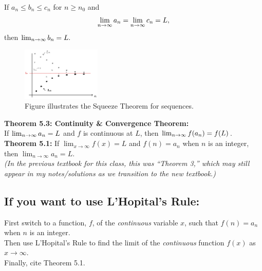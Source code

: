 If \(a_n \leq b_n \leq c_n\) for \(n \geq n_0\) and 
\[
\lim_{n\rightarrow\infty} a_n = \lim_{n\rightarrow\infty} c_n = L,
\]
then \(\lim_{n\rightarrow\infty} b_n = L.\)
~\\

\hspace*{.2in}


\begin{figure}[!h]
\centering
\includegraphics[height=1in]{Ch8s1-squeeze.png}
 \caption{Figure illustrates the Squeeze Theorem for sequences.}

\end{figure}



\textbf{Theorem 5.3: Continuity \& Convergence Theorem:}\\
If \( \lim_{n\rightarrow\infty} a_n = L\) and \(f\) is continuous at \(L\), then \( \lim_{n\rightarrow\infty} f(a_n) = f(L)\).\\




\textbf{Theorem 5.1:} If \(\lim_{x\rightarrow\infty} f(x) = L\) and \(f(n)=a_n\) when \(n\) is an integer, then \(\lim_{n\rightarrow\infty} a_n = L\).\\
\textit{(In the previous textbook for this class, this was ``Theorem 3,'' which may still appear in my notes/solutions as we transition to the new textbook.)}\\


\vspace*{.1in}
\subsection*{If you want to use L'Hopital's Rule:}
First switch to a function, \(f\),  of the \textit{continuous} variable \(x\), such that \(f(n) = a_n\) when \(n\) is an integer.\\
Then use L'Hopital's Rule to find the limit of the \textit{continuous} function \(f(x)\) as \(x\rightarrow \infty\).\\
Finally, cite Theorem 5.1.




%
%


